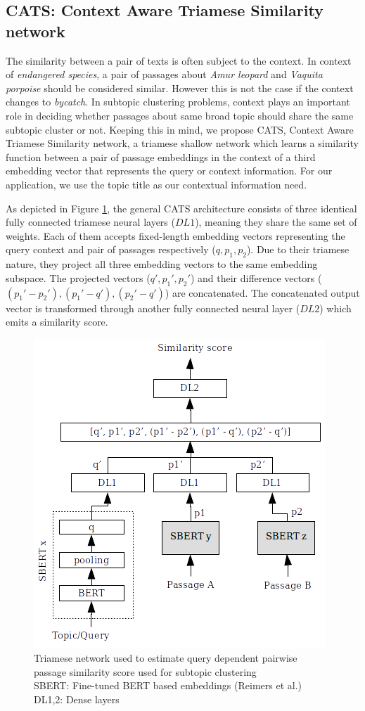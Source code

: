 \subsection{CATS: Context Aware Triamese Similarity network}\label{sec:cats} 
The similarity between a pair of texts is often subject to the context. In context of \textit{endangered species}, a pair of passages about \textit{Amur leopard} and \textit{Vaquita porpoise} should be considered similar. However this is not the case if the context changes to \textit{bycatch}. In subtopic clustering problems, context plays an important role in deciding whether passages about same broad topic should share the same subtopic cluster or not. Keeping this in mind, we propose CATS, Context Aware Triamese Similarity network, a triamese shallow network which learns a similarity function between a pair of passage embeddings in the context of a third embedding vector that represents the query or context information. For our application, we use the topic title as our contextual information need.

As depicted in Figure \ref{fig:triam}, the general CATS architecture consists of three identical fully connected triamese neural layers ($DL1$), meaning they share the same set of weights. Each of them accepts fixed-length embedding vectors representing the query context and pair of passages respectively ($q,p_1,p_2$). Due to their triamese nature, they project all three embedding vectors to the same embedding subspace. The projected vectors ($q',p_1',p_2'$) and their difference vectors ($(p_1'-p_2'),(p_1'-q'),(p_2'-q')$) are concatenated. The concatenated output vector is transformed through another fully connected neural layer ($DL2$) which emits a similarity score.
\begin{figure}[h]
  \centering
  \includegraphics[width=0.8\linewidth]{graphics/triamese.png}
  \caption{Triamese network used to estimate query dependent pairwise passage similarity score used for subtopic clustering \\
  SBERT: Fine-tuned BERT based embeddings (Reimers et al.) \\
  DL1,2: Dense layers}
  \label{fig:triam}
\end{figure}


